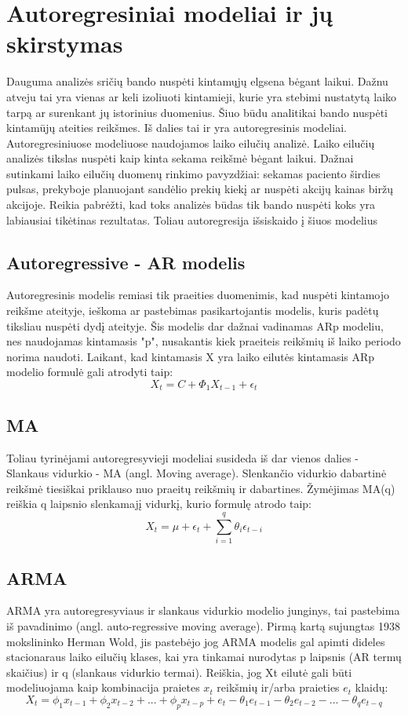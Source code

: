 \documentclass{VUMIFInfKursinis}
\begin{document}
\section{Autoregresiniai modeliai ir jų skirstymas}
Dauguma analizės sričių bando nuspėti kintamųjų elgsena bėgant laikui. Dažnu atveju tai yra vienas ar keli izoliuoti kintamieji, kurie yra stebimi nustatytą laiko
tarpą ar surenkant jų istorinius duomenius. Šiuo būdu analitikai bando nuspėti kintamūjų ateities reikšmes. Iš dalies tai ir yra autoregresinis modeliai. 
Autoregresiniuose modeliuose naudojamos laiko eilučių analizė. Laiko eilučių analizės tikslas nuspėti kaip kinta sekama reikšmė bėgant laikui. Dažnai sutinkami laiko eilučių
duomenų rinkimo pavyzdžiai: sekamas paciento širdies pulsas, prekyboje planuojant sandėlio prekių kiekį ar nuspėti akcijų kainas biržų akcijoje.
Reikia pabrėžti, kad toks analizės būdas tik bando nuspėti koks yra labiausiai tikėtinas rezultatas. Toliau autoregresija išsiskaido į šiuos modelius
\subsection{Autoregressive - AR modelis}
Autoregresinis modelis remiasi tik praeities duomenimis, kad nuspėti kintamojo reikšme ateityje, ieškoma ar pastebimas pasikartojantis modelis, kuris padėtų tiksliau nuspėti dydį ateityje.
Šis modelis dar dažnai vadinamas ARp modeliu, nes naudojamas kintamasis "p", nusakantis kiek praeiteis reikšmių iš laiko periodo norima naudoti.
Laikant, kad kintamasis X yra laiko eilutės kintamasis ARp modelio formulė gali atrodyti taip: \[X_{t} = C + \Phi _{1}X_{t-1}+\epsilon_{t} \]


\subsection {MA}
Toliau tyrinėjami autoregresyvieji modeliai susideda iš dar vienos dalies - Slankaus vidurkio - MA (angl. Moving average). Slenkančio vidurkio dabartinė
reikšmė tiesiškai priklauso nuo praeitų reikšmių ir dabartines. Žymėjimas MA(q) reiškia q laipsnio slenkamajį vidurkį, kurio formulę atrodo taip:  
\[X_{t} = \mu + \epsilon_{t} + \sum_{i=1}^{q}\theta_{i}  \epsilon_{t-i}\]

\subsection {ARMA}
ARMA yra autoregresyviaus ir slankaus vidurkio modelio junginys, tai pastebima iš pavadinimo (angl. auto-regressive moving average). Pirmą kartą sujungtas 1938 mokslininko Herman Wold, jis
pastebėjo jog ARMA modelis gal apimti dideles stacionaraus laiko eilučių klases, kai yra tinkamai nurodytas p laipsnis (AR termų skaičius) ir q (slankaus vidurkio termai).
Reiškia, jog Xt eilutė gali būti modeliuojama kaip kombinacija praietes $x_{t}$ reikšmių ir/arba praieties $e_{t}$ klaidų:
\[X_{t} = \phi_{1}x_{t-1} + \phi_{2}x_{t-2} + ... + \phi_{p}x_{t-p} + e_{t} - \theta_{1}e_{t-1} - \theta_{2}e_{t-2} - ... - \theta_{q}e_{t-q}\]
\end{document}
